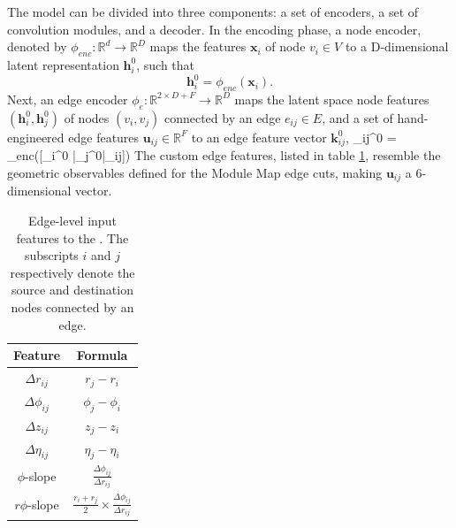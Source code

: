 The model can be divided into three components: a set of encoders, a set of convolution modules, and a decoder. In the encoding phase, a node encoder, denoted by $\phi_{enc}: \mathbb{R}^d \rightarrow \mathbb{R}^D$ maps the features $\mathbf{x}_i$ of node $v_i \in V$ to a D-dimensional latent representation $\mathbf{h}_i^0$, such that
\begin{equation}
    \label{eq:10.5}
    \mathbf{h}_i^0 = \phi_{enc}(\mathbf{x}_i).
\end{equation}
Next, an edge encoder $\phi_e:\mathbb{R}^{2\times D + F}\rightarrow \mathbb{R}^D$ maps the latent space node features $(\mathbf{h}_i^0, \mathbf{h}_j^0)$ of nodes $(v_i, v_j)$ connected by an edge $e_{ij}\in E$, and a set of hand-engineered edge features $\mathbf{u}_{ij}\in \mathbb{R}^F$ to an edge feature vector $\mathbf{k}_{ij}^0$,
\beq
\label{eq:10.6}
_{ij}^0 = \psi_{enc}([_i^0 |_j^0|_{ij}])
\eeq
The custom edge features, listed in table \ref{tab:gnn-edge-features}, resemble the geometric observables defined for the Module Map edge cuts, making $\mathbf{u}_{ij}$ a 6-dimensional vector.

\begin{table}[h!]
    \centering
    \begin{tabular}{|c|c|}
    \hline
      Feature & Formula \\ \hline\hline
     $\Delta r_{ij}$    & $r_j - r_i$ \\ \hline
     $\Delta \phi_{ij}$ & $\phi_j - \phi_i$ \\ \hline
     $\Delta z_{ij}$ & $z_j - z_i$ \\ \hline
     $\Delta \eta_{ij}$ & $\eta_j - \eta_i$ \\ \hline
     $\phi$-slope & $\frac{\Delta\phi_{ij}}{\Delta r_{ij}}$ \\ \hline
     $r\phi$-slope & $\frac{r_i+r_j}{2}\times \frac{\Delta\phi_{ij}}{\Delta r_{ij}}$ \\ \hline \hline
    \end{tabular}
    \caption{Edge-level input features to the \ignn. The subscripts $i$ and $j$ respectively denote the source and destination nodes connected by an edge.}
    \label{tab:gnn-edge-features}
\end{table}

